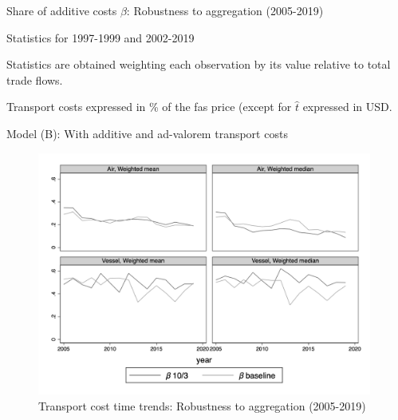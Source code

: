 \documentclass[a4paper,11pt]{article}
\begin{document}
\begin{table}[htbp]
	\centering
	\caption{Share of additive costs $\beta$: Robustness to aggregation (2005-2019)} \vspace{5mm} \label{tab:baseline10}
	
	\begin{tablenotes}
		\scriptsize
		\item Statistics for 1997-1999 and 2002-2019
		\item Statistics are obtained weighting each observation by its value relative to total trade flows.
        \item Transport costs expressed in \% of the fas price (except for $\widehat{t}$ expressed in USD.
		\item Model (B): With additive and ad-valorem transport costs
	\end{tablenotes}
\end{table}


\begin{figure}[htbp]
	\caption{Transport cost time trends: Robustness to aggregation (2005-2019)}
	\label{fig:robustness_to_agregation}
	\begin{center}
		\includegraphics[height=8cm]{scatter_chronology_baseline10_dbsamesample10_5_3.png}
	\end{center}
\end{figure}
\end{document}
